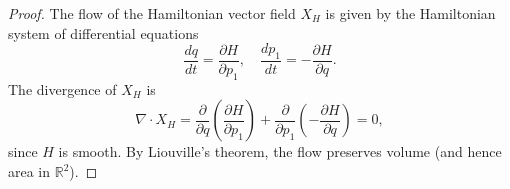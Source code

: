 \documentclass[11pt]{article}
\theoremstyle{definition}
\theoremstyle{remark}
\begin{document}
\begin{proof}
The flow of the Hamiltonian vector field $X_H$ is given by the Hamiltonian system of differential equations
\[
\frac{dq}{dt} = \frac{\partial H}{\partial p_1}, \quad \frac{dp_1}{dt} = -\frac{\partial H}{\partial q}.
\]
The divergence of $X_H$ is
\[
\nabla \cdot X_H = \frac{\partial}{\partial q}\left(\frac{\partial H}{\partial p_1}\right) + \frac{\partial}{\partial p_1}\left(-\frac{\partial H}{\partial q}\right) = 0,
\]
since $H$ is smooth. By Liouville's theorem, the flow preserves volume (and hence area in $\mathbb{R}^2$).
\end{proof}
\end{document}
